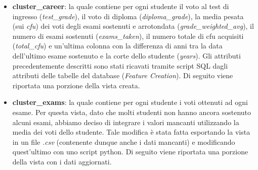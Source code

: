 \documentclass[]{article}
\begin{document}
\begin{itemize}
	\item \textbf{cluster\_career}: la quale contiene per ogni studente il voto al test di ingresso (\textit{test\_grade}), il voto di diploma (\textit{diploma\_grade}), la media pesata (sui \textit{cfu}) dei voti degli esami sostenuti e arrotondata (\textit{grade\_weighted\_avg}), il numero di esami sostenuti (\textit{exams\_taken}), il numero totale di cfu acquisiti (\textit{total\_cfu}) e un'ultima colonna con la differenza di anni tra la data dell'ultimo esame sostenuto e la corte dello studente (\textit{years}). Gli attributi precedentemente descritti sono stati ricavati tramite script SQL dagli attributi delle tabelle del database (\textit{Feature Creation}). Di seguito viene riportata una porzione della vista creata.
	
	\begin{center}
	\end{center}

	\item \textbf{cluster\_exams}: la quale contiene per ogni studente i voti ottenuti ad ogni esame. Per questa vista, dato che molti studenti non hanno ancora sostenuto alcuni esami, abbiamo deciso di integrare i valori mancanti utilizzando la media dei voti dello studente. Tale modifica \`{e} stata fatta esportando la vista in un file \textit{.csv} (contenente dunque anche i dati mancanti) e modificando quest'ultimo con uno script python. Di seguito viene riportata una porzione della vista con i dati aggiornati.
	
	\begin{center}
	\end{center}	
	
\end{itemize} 
\end{document}
